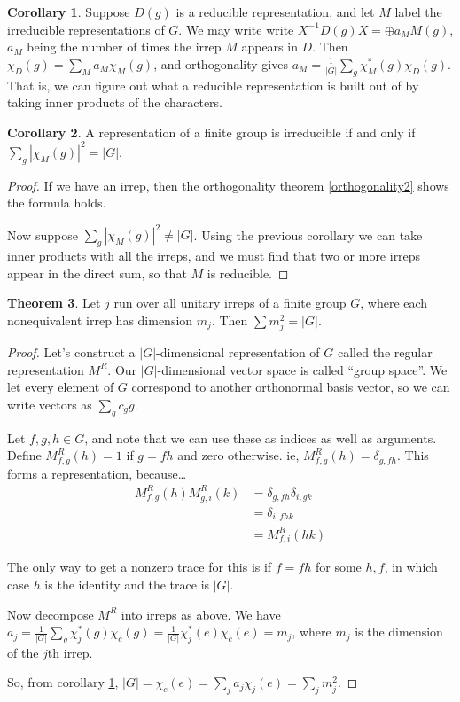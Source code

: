 \documentclass[12pt, letterpaper]{article}
\theoremstyle{definition} %
\newtheorem{thm}{Theorem}[section] %
\newtheorem{cor}[thm]{Corollary}
\begin{document}
\begin{cor}
  Suppose $D(g)$ is a reducible representation, and let $M$ label the irreducible representations of $G$. 
  We may write write $X^{-1}D(g)X=\oplus a_M M(g)$, $a_M$ being the number of times the irrep $M$ appears in $D$.
  Then $\chi_D(g)=\sum_M a_M \chi_M(g)$, and orthogonality gives $a_M=\frac{1}{|G|} \sum_g \chi_M^*(g) \chi_D(g)$. That is, we can figure out what a reducible representation 
  is built out of by taking inner products of the characters.
  \label{innerrep}
\end{cor}
\begin{cor}
  A representation of a finite group is irreducible if and only if $\sum_g |\chi_M(g)|^2=|G|$. 
\end{cor}
\begin{proof}
  If we have an irrep, then the orthogonality theorem \ref{orthogonality2} shows the 
  formula holds.

  Now suppose $\sum_g |\chi_M(g)|^2\neq |G|$. Using the previous corollary we can take
  inner products with all the irreps, and we must find that two or more irreps
  appear in the direct sum, so that $M$ is reducible.
\end{proof}
\begin{thm}
  Let $j$ run over all unitary irreps of a finite group $G$, where each nonequivalent irrep has dimension $m_j$. 
  Then $\sum m_j^2=|G|$.
\end{thm}
\begin{proof}
  Let's construct a $|G|$-dimensional representation of $G$ called the regular representation $M^R$. 
  Our $|G|$-dimensional vector space is called ``group space''. We let every element of $G$ correspond to
  another orthonormal basis vector, so we can write vectors as $\sum_g c_g g$.
  
  Let $f,g,h\in G$, and note that we can
  use these as indices as well as arguments.
  Define $M^R_{f, g}(h)=1$ if $g=fh$ and zero otherwise. ie, $M^R_{f, g}(h)=\delta_{g,fh}$. This forms a representation, because\dots
  \begin{align*}
    M^R_{f, g}(h) M^R_{g, i}(k)&= \delta_{g,fh}\delta_{i,gk}\\
    &=\delta_{i,fhk}\\
    &= M^R_{f,i}(hk)
  \end{align*}
  
  The only way to get a nonzero trace for this is if $f=fh$ for some $h,f$, in which case $h$ is the identity and
  the trace is $|G|$.

  Now decompose $M^R$ into irreps as above. We have $a_j=\frac{1}{|G|}\sum_g \chi_j^*(g) \chi_c(g)=\frac{1}{|G|} \chi_j^*(e)\chi_c(e)=m_j$,
  where $m_j$ is the dimension of the $j$th irrep.

  So, from corollary \ref{innerrep}, $|G|=\chi_c(e)=\sum_j a_j \chi_j(e)=\sum_j m_j^2$.
\end{proof}
\end{document}
